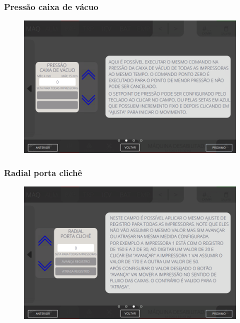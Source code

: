 \newpage
\thispagestyle{fancy}
\vspace*{40 pt}
\subsubsection{\small{Pressão caixa de vácuo}} \label{sec:segundaTelaGeralAjustesImpressorasPressaoCaixaVaco}
\vspace*{\fill}
\begin{figure}[h]
    \centering
    \includegraphics[width=576 px,height=360 px]{src/imagesICV/04-printters/01-printters/settings/11.png}
\end{figure}
\vspace*{\fill}

\newpage
\thispagestyle{fancy}
\vspace*{40 pt}
\subsubsection{\small{Radial porta clichê}} \label{sec:segundaTelaGeralAjustesImpressorasRadialPortaCliche}
\vspace*{\fill}
\begin{figure}[h]
    \centering
    \includegraphics[width=576 px,height=360 px]{src/imagesICV/04-printters/01-printters/settings/12.png}
\end{figure}
\vspace*{\fill}

